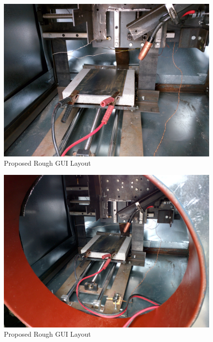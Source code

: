 \documentclass[12pt]{article}
\begin{document}
\begin{figure}[h]
\centering
\includegraphics[width=1\textwidth]{IMG_20150410_163441}
\caption{Proposed Rough GUI Layout}
\end{figure}

\clearpage

\begin{figure}[h]
\centering
\includegraphics[width=1\textwidth]{IMG_20150410_163433}
\caption{Proposed Rough GUI Layout}
\end{figure}

\clearpage
\end{document}
